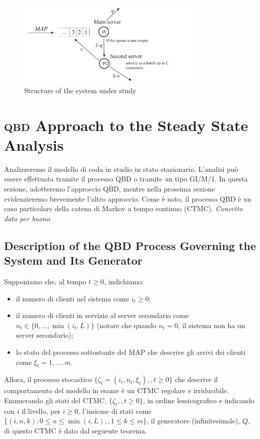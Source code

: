 \documentclass[11pt]{article}
\begin{document}
\begin{figure}[h]
    \centering
    \includegraphics[width=0.8\textwidth]{hVQg024.png}
    \caption{Structure of the system under study}
    \label{fig:diagramma_di_stato}
\end{figure}

\section{\textsc{qbd} Approach to the Steady State Analysis}

Analizzeremo il modello di coda in studio in stato stazionario. L'analisi può essere effettuata tramite il processo QBD o tramite un tipo GI/M/1. In questa sezione, adotteremo l'approccio QBD, mentre nella prossima sezione evidenzieremo brevemente l'altro approccio. Come è noto, il processo QBD è un caso particolare della catena di Markov a tempo continuo (CTMC). \emph{Concetto dato per buono}

\subsection{Description of the QBD Process Governing the System and Its Generator}

Supponiamo che, al tempo $t\geq 0$, indichiamo:
\begin{itemize}
    \item il numero di clienti nel sistema come $i_t\geq 0$;
    \item il numero di clienti in servizio al server secondario come $n_t\in\{0,\ldots,\min(i_t,L)\}$ (notare che quando $n_t=0$, il sistema non ha un server secondario);
    \item lo stato del processo sottostante del MAP che descrive gli arrivi dei clienti come $\xi_t=1,\ldots,m$.
\end{itemize}
Allora, il processo stocastico $\{\zeta_t=(i_t,n_t,\xi_t),,t\geq 0\}$ che descrive il comportamento del modello in esame è un CTMC regolare e irriducibile. Enumerando gli stati del CTMC, $\{\zeta_t,,t\geq 0\}$, in ordine lessicografico e indicando con $i$ il livello, per $i\geq 0$, l'insieme di stati come $\{(i,n,k):0\leq n\leq \min(i,L),,1\leq k\leq m\}$, il generatore (infinitesimale), $Q$, di questo CTMC è dato dal seguente teorema.
\end{document}
